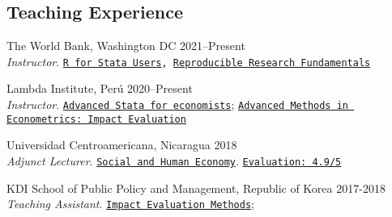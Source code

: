 \documentclass[a4paper, 10pt]{article}
\renewenvironment{itemize}{
  \begin{list}{}
    { \setlength{\itemsep}{5pt}
      \setlength{\parsep}{0pt}
      \setlength{\topsep}{0pt}
      \setlength{\leftmargin}{0em} } }{
  \end{list}}
\begin{document}
\subsection*{Teaching Experience}
\begin{itemize}
  \item The World Bank, Washington DC \hfill 2021--Present \\  {\small \emph{Instructor}.} \texttt{\href{https://github.com/worldbank/dime-r-training}{R for Stata Users}, \href{https://github.com/dime-worldbank/rrf-course}{\texttt{Reproducible Research Fundamentals}}}

  \item Lambda Institute, Perú \hfill 2020--Present \\ {\small \emph{Instructor}.} \texttt{\href{https://github.com/lambda-stata/course-materials}{Advanced Stata for economists}}; \href{https://github.com/lambda-stata/econometria-avanzada}{\texttt{Advanced Methods in Econometrics: Impact Evaluation}}
 
  \item Universidad Centroamericana, Nicaragua \hfill 2018 \\ {\small \emph{Adjunct Lecturer}.} \texttt{\href{https://github.com/econsoc-uca}{Social and Human Economy}}. \texttt{\href{https://rrmaximiliano.github.io/docs/evaluation-esh.pdf}{Evaluation: 4.9/5}}
  
  \item KDI School of Public Policy and Management, Republic of Korea \hfill 2017-2018 \\ {\small \emph{Teaching Assistant}.} \texttt{\href{https://www.dropbox.com/home/teaching_materials/kdischool/spring_2018_impact_evaluation}{Impact Evaluation Methods}}; \texttt{\color{darkblue}{Foundations of Sustainable Development}}
\end{itemize}

\end{document}
